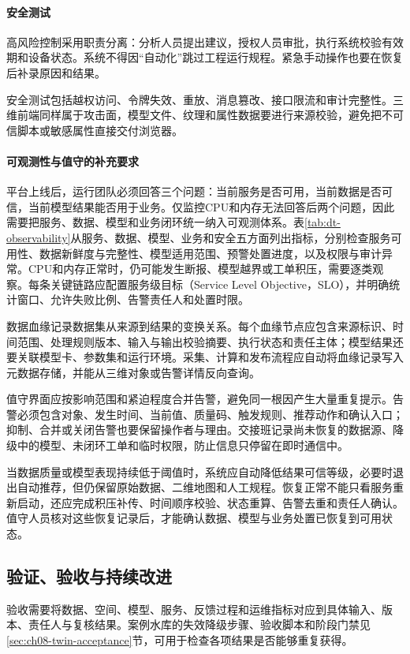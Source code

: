 \paragraph{安全测试}
高风险控制采用职责分离：分析人员提出建议，授权人员审批，执行系统校验有效期和设备状态。系统不得因“自动化”跳过工程运行规程。紧急手动操作也要在恢复后补录原因和结果。

安全测试包括越权访问、令牌失效、重放、消息篡改、接口限流和审计完整性。三维前端同样属于攻击面，模型文件、纹理和属性数据要进行来源校验，避免把不可信脚本或敏感属性直接交付浏览器。

\paragraph{可观测性与值守的补充要求}
平台上线后，运行团队必须回答三个问题：当前服务是否可用，当前数据是否可信，当前模型结果能否用于业务。仅监控CPU和内存无法回答后两个问题，因此需要把服务、数据、模型和业务闭环统一纳入可观测体系。表\ref{tab:dt-observability}从服务、数据、模型、业务和安全五方面列出指标，分别检查服务可用性、数据新鲜度与完整性、模型适用范围、预警处置进度，以及权限与审计异常。CPU和内存正常时，仍可能发生断报、模型越界或工单积压，需要逐类观察。每条关键链路应配置服务级目标（Service Level Objective，SLO），并明确统计窗口、允许失败比例、告警责任人和处置时限。

数据血缘记录数据集从来源到结果的变换关系。每个血缘节点应包含来源标识、时间范围、处理规则版本、输入与输出校验摘要、执行状态和责任主体；模型结果还要关联模型卡、参数集和运行环境。采集、计算和发布流程应自动将血缘记录写入元数据存储，并能从三维对象或告警详情反向查询。

值守界面应按影响范围和紧迫程度合并告警，避免同一根因产生大量重复提示。告警必须包含对象、发生时间、当前值、质量码、触发规则、推荐动作和确认入口；抑制、合并或关闭告警也要保留操作者与理由。交接班记录尚未恢复的数据源、降级中的模型、未闭环工单和临时权限，防止信息只停留在即时通信中。

当数据质量或模型表现持续低于阈值时，系统应自动降低结果可信等级，必要时退出自动推荐，但仍保留原始数据、二维地图和人工规程。恢复正常不能只看服务重新启动，还应完成积压补传、时间顺序校验、状态重算、告警去重和责任人确认。值守人员核对这些恢复记录后，才能确认数据、模型与业务处置已恢复到可用状态。

\subsection{验证、验收与持续改进}\label{online:twin-acceptance}

验收需要将数据、空间、模型、服务、反馈过程和运维指标对应到具体输入、版本、责任人与复核结果。案例水库的失效降级步骤、验收脚本和阶段门禁见\ref{sec:ch08-twin-acceptance}节，可用于检查各项结果是否能够重复获得。

